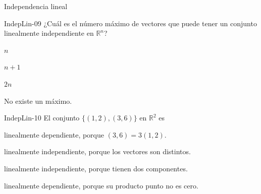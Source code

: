\documentclass[a4,11pt]{aleph-notas}
\begin{document}
\begin{quiz}{Independencia lineal}
\begin{multi}[]%
    {IndepLin-09}
    ¿Cuál es el número máximo de vectores que puede tener un conjunto linealmente independiente en \(\mathbb{R}^n\)?
    \item* \(n\)
    \item \(n+1\)
    \item \(2n\)
    \item No existe un máximo.
\end{multi}

\begin{multi}[]%
    {IndepLin-10}
    El conjunto \(\{(1,2),(3,6)\}\) en \(\mathbb{R}^2\) es
    \item* linealmente dependiente, porque \((3,6)=3(1,2)\).
    \item linealmente independiente, porque los vectores son distintos.
    \item linealmente independiente, porque tienen dos componentes.
    \item linealmente dependiente, porque su producto punto no es cero.
\end{multi}


\end{quiz}
\end{document}
